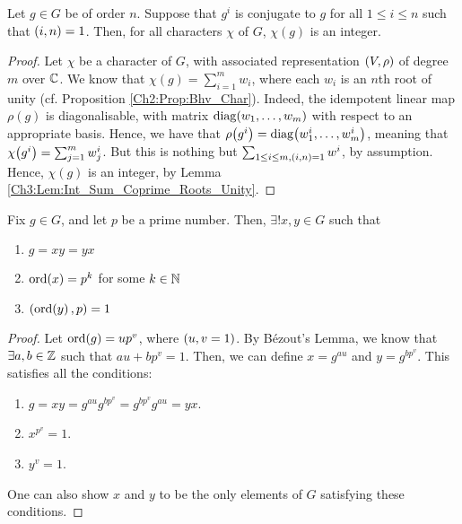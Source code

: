 \begin{proposition}
    Let $g \in G$ be of order $n$. Suppose that $g^i$ is conjugate to $g$ for all $1 \leq i \leq n$ such that $\left( i,n \right) = 1$. Then, for all characters $\chi$ of $G$, $\chi(g)$ is an integer.
\end{proposition}
\begin{proof}
    Let $\chi$ be a character of $G$, with associated representation $\left( V, \rho \right)$ of degree $m$ over $\mathbb{C}$. We know that $\chi(g) = \sum_{i=1}^{m} w_i$, where each $w_i$ is an $n$th root of unity (cf. Proposition \ref{Ch2:Prop:Bhv_Char}). Indeed, the idempotent linear map $\rho(g)$ is diagonalisable, with matrix $\operatorname{diag}\!\left( w_1, \ldots, w_m \right)$ with respect to an appropriate basis. Hence, we have that $\rho\!\left( g^i \right) = \operatorname{diag}\!\left( w_1^i, \ldots, w_m^i \right)$, meaning that $\chi\!\left( g^i \right) = \sum_{j=1}^{m} w_j^i$. But this is nothing but $\sum_{1 \leq i \leq m, \left( i,n \right) = 1} w^i$, by assumption. Hence, $\chi(g)$ is an integer, by Lemma \ref{Ch3:Lem:Int_Sum_Coprime_Roots_Unity}.
\end{proof}


\begin{lemma} \label{Ch2:Lem:p_and_p'_parts}
    Fix $g \in G$, and let $p$ be a prime number. Then, $\exists! x, y \in G$ such that
    \begin{enumerate}[label= \normalfont \arabic*., noitemsep]
        \item $g = xy = yx$
        \item $\operatorname{ord}\!\left( x \right) = p^k$ for some $k \in \mathbb{N}$
        \item $\left( \operatorname{ord}\!\left( y \right), p \right) = 1$
    \end{enumerate}
\end{lemma}
\begin{proof}
    Let $\operatorname{ord}\!\left( g \right) = u p^v$, where $\left( u,v = 1 \right)$. By Bézout's Lemma, we know that $\exists a, b \in \mathbb{Z}$ such that $au + bp^v = 1$. %
    Then, we can define $x = g^{au}$ and $y = g^{bp^v}$. This satisfies all the conditions:
    \begin{enumerate}
        \item $g = xy = g^{au} g^{bp^v} = g^{bp^v} g^{au} = yx$.
        \item $x^{p^v} = 1$. %
        \item $y^v = 1$.    %
    \end{enumerate}
    One can also show $x$ and $y$ to be the only elements of $G$ satisfying these conditions. %
\end{proof}

